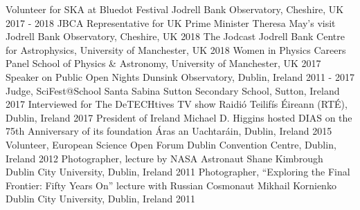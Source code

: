 \begin{cvpress}
   \cvpres
   {Volunteer for SKA at Bluedot Festival}
    {Jodrell Bank Observatory, Cheshire, UK}
    {2017 - 2018}
   \cvpres
   {JBCA Representative for UK Prime Minister Theresa May's visit}
    {Jodrell Bank Observatory, Cheshire, UK}
    {2018}
   \cvpres
   {The Jodcast}
    {Jodrell Bank Centre for Astrophysics, University of Manchester, UK}
    {2018}
   \cvpres
   {Women in Physics Careers Panel}
    {School of Physics \& Astronomy, University of Manchester, UK}
    {2017}
   \cvpres
   {Speaker on Public Open Nights}
    {Dunsink Observatory, Dublin, Ireland}
    {2011 - 2017}
   \cvpres
   {Judge, SciFest@School}
    {Santa Sabina Sutton Secondary School, Sutton, Ireland}
    {2017}
   \cvpres
   {Interviewed for The DeTECHtives TV show}
    {Raidi{\'o} Teilif{\'i}s {\'E}ireann (RT{\'E}), Dublin, Ireland}
    {2017}
   \cvpres
   {President of Ireland Michael D. Higgins hosted DIAS on the 75th Anniversary of its foundation}
    {{\'A}ras an Uachtar{\'a}in, Dublin, Ireland}
    {2015}
   \cvpres
   {Volunteer, European Science Open Forum}
    {Dublin Convention Centre, Dublin, Ireland}
    {2012}
   \cvpres
   	{Photographer, lecture by NASA Astronaut Shane Kimbrough}
    {Dublin City University, Dublin, Ireland}
    {2011}
   \cvpres
   	{Photographer, ``Exploring the Final Frontier: Fifty Years On'' lecture with Russian Cosmonaut Mikhail Kornienko}
    {Dublin City University, Dublin, Ireland}
    {2011}
\end{cvpress}


